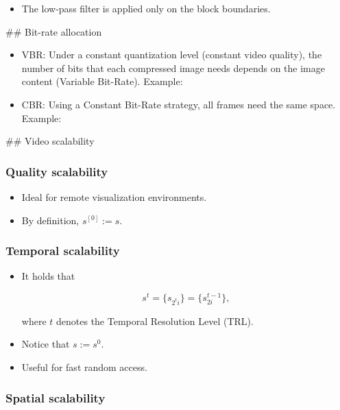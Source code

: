 {\begin{enumerate}
\begin{itemize}
\tightlist
\item
  The low-pass filter is applied only on the block boundaries.
\end{itemize}

    \#\# Bit-rate allocation

\begin{itemize}
\item
  VBR: Under a constant quantization level (constant video quality), the
  number of bits that each compressed image needs depends on the image
  content (Variable Bit-Rate). Example:
\item
  CBR: Using a Constant Bit-Rate strategy, all frames need the same
  space. Example:
\end{itemize}

    \#\# Video scalability

    \hypertarget{quality-scalability}{%
\subsubsection{Quality scalability}\label{quality-scalability}}

\begin{itemize}
\item
  Ideal for remote visualization environments.
\item
  By definition, \(s^{[0]}:=s\).
\end{itemize}

    \hypertarget{temporal-scalability}{%
\subsubsection{Temporal scalability}\label{temporal-scalability}}

\begin{itemize}
\item
  It holds that

  \begin{equation}
    s^{t}=\{s_{2^t i}\}=\{s_{2i}^{t-1}\},
  \end{equation}

  where \(t\) denotes the Temporal Resolution Level (TRL).
\item
  Notice that \(s:=s^{0}\).
\item
  Useful for fast random access.
\end{itemize}

    \hypertarget{spatial-scalability}{%
\subsubsection{Spatial scalability}\label{spatial-scalability}}


\end{enumerate}}
